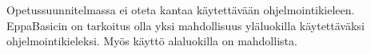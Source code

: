 Opetussuunnitelmassa ei
oteta kantaa käytettävään
ohjelmointikieleen.
EppaBasicin on tarkoitus olla
yksi mahdollisuus yläluokilla
käytettäväksi ohjelmointikieleksi.
Myös käyttö alaluokilla on
mahdollista.